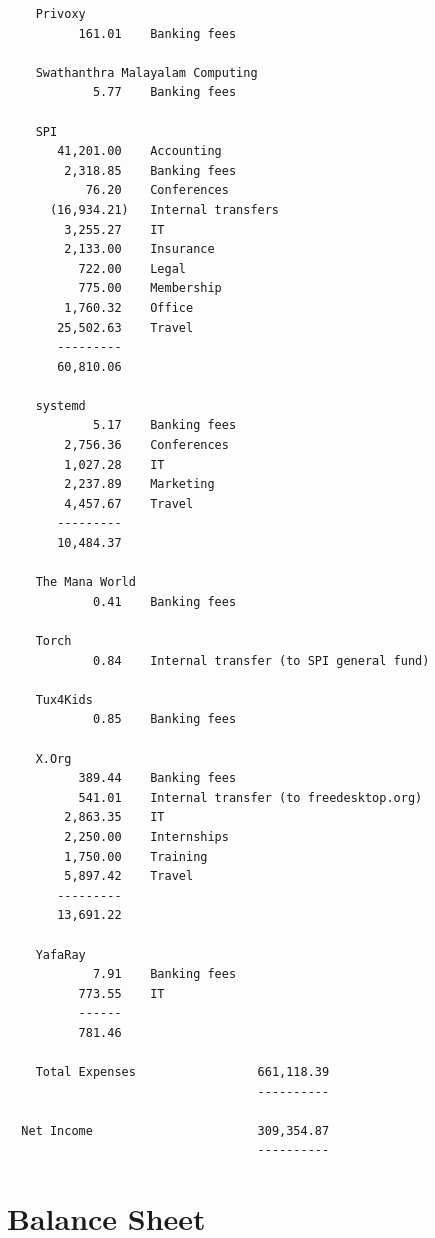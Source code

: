 \documentclass[a4paper]{report}
\begin{document}
\begin{verbatim}
    Privoxy
          161.01    Banking fees

    Swathanthra Malayalam Computing
            5.77    Banking fees

    SPI
       41,201.00    Accounting
        2,318.85    Banking fees
           76.20    Conferences
      (16,934.21)   Internal transfers
        3,255.27    IT
        2,133.00    Insurance
          722.00    Legal
          775.00    Membership
        1,760.32    Office
       25,502.63    Travel
       ---------
       60,810.06

    systemd
            5.17    Banking fees
        2,756.36    Conferences
        1,027.28    IT
        2,237.89    Marketing
        4,457.67    Travel
       ---------
       10,484.37

    The Mana World
            0.41    Banking fees

    Torch
            0.84    Internal transfer (to SPI general fund)

    Tux4Kids
            0.85    Banking fees

    X.Org
          389.44    Banking fees
          541.01    Internal transfer (to freedesktop.org)
        2,863.35    IT
        2,250.00    Internships
        1,750.00    Training
        5,897.42    Travel
       ---------
       13,691.22

    YafaRay
            7.91    Banking fees
          773.55    IT
          ------
          781.46

    Total Expenses                 661,118.39
                                   ----------

  Net Income                       309,354.87
                                   ----------
\end{verbatim}

\section{Balance Sheet}
\end{document}
